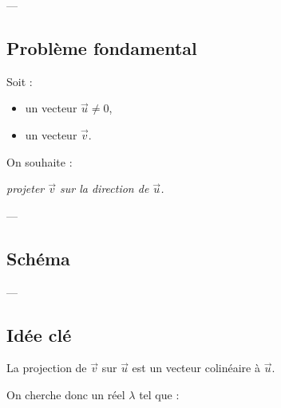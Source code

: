 \documentclass[11pt,a4paper]{article}
\begin{document}
---

\subsection{Problème fondamental}

Soit :

\begin{itemize}
\item un vecteur $\vec{u} \neq 0$,
\item un vecteur $\vec{v}$.
\end{itemize}

\bigskip

On souhaite :

\begin{center}
\textit{projeter $\vec{v}$ sur la direction de $\vec{u}$.}
\end{center}

---

\subsection{Schéma}

\begin{center}
\end{center}

---

\subsection{Idée clé}

La projection de $\vec{v}$ sur $\vec{u}$ est un vecteur colinéaire à $\vec{u}$.

\bigskip

On cherche donc un réel $\lambda$ tel que :
\end{document}
